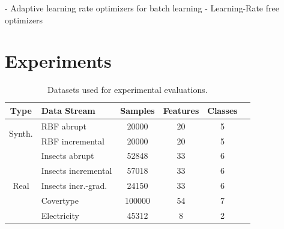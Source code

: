 \documentclass[letterpaper]{article} %
\begin{document}
- Adaptive learning rate optimizers for batch learning \citep{kingmaAdamMethodStochastic2017b,zeilerADADELTAAdaptiveLearning2012a,duchiAdaptiveSubgradientMethods2011,tielemanLecture5rmspropDivide2012}
- Learning-Rate free optimizers \citep{wuWNGradLearnLearning2020,schaulNoMorePesky2013,orabonaTrainingDeepNetworks2017,miyaguchiCograConceptDriftAwareStochastic2019,
	vanervenMetaGradMultipleLearning2016a,baydinOnlineLearningRate2018}



\section{Experiments}\label{sec:experiments}

\begin{table}[ht]
	\small
	\begin{tabular}{@{}clcccc@{}}
		\toprule
		Type                    & Data Stream            & Samples & Features & Classes \\
		\midrule
		\multirow{2}{*}{Synth.} & RBF abrupt             & 20000   & 20       & 5       \\
		                        & RBF incremental        & 20000   & 20       & 5       \\
		\midrule
		\multirow{5}{*}{Real}   & Insects abrupt         & 52848   & 33       & 6       \\
		                        & Insects incremental    & 57018   & 33       & 6       \\
		                        & Insects incr.-grad.    & 24150   & 33       & 6       \\
		                        & Covertype\footnotemark & 100000  & 54       & 7       \\
		                        & Electricity            & 45312   & 8        & 2       \\
		\bottomrule
	\end{tabular}\label{tab:datasets}
	\caption{Datasets used for experimental evaluations.}
\end{table}

\end{document}

